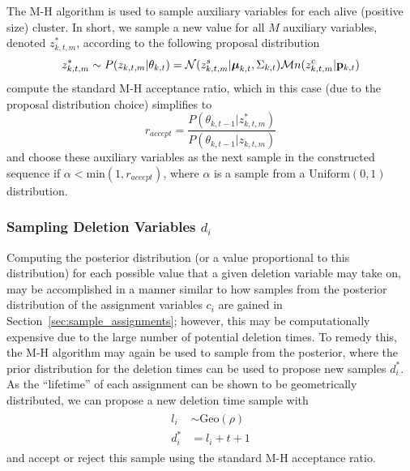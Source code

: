 \documentclass[smallcondensed, final]{svjour3}
\begin{document}
The M-H algorithm is used to sample auxiliary variables for each alive (positive size) cluster. In short, we sample a new value for all $M$ auxiliary variables, denoted $z_{k,t,m}^{*}$, according to the following proposal distribution
\begin{equation}
\label{proposal_distro}
z_{k,t,m}^{*}  \sim  P(z_{k,t,m} | \theta_{k,t}) = \mathcal{N}(z_{k,t,m}^{s} | \boldsymbol{\mu}_{k,t}, \Sigma_{k,t}) \mathcal{M}n(z_{k,t,m}^{c} | \bold{p}_{k,t})
\end{equation}
compute the standard M-H acceptance ratio, which in this case (due to the proposal distribution choice) simplifies to 
\begin{equation}
\label{accept_ratio}
r_{accept} = \frac{P(\theta_{k,t-1} | z_{k,t,m}^{*})}{P(\theta_{k,t-1} | z_{k,t,m})}
\end{equation}
and choose these auxiliary variables as the next sample in the constructed sequence if $\alpha < \text{min}(1, r_{accept})$, where $\alpha$ is a sample from a $\text{Uniform}(0,1)$ distribution.






\subsubsection{Sampling Deletion Variables $d_{i}$}
Computing the posterior distribution (or a value proportional to this distribution) for each possible value that a given deletion variable may take on, may be accomplished in a manner similar to how samples from the posterior distribution of the assignment variables $c_{i}$ are gained in Section~\ref{sec:sample_assignments}; however, this may be computationally expensive due to the large number of potential deletion times. To remedy this, the M-H algorithm may again be used to sample from the posterior, where the prior distribution for the deletion times can be used to propose new samples $d_{i}^{*}$. As the ``lifetime'' of each assignment can be shown to be geometrically distributed, we can propose a new deletion time sample with
\begin{align}
\begin{split}
l_{i}  &\sim  \text{Geo}(\rho)  \\
d_{i}^{*}  &= l_{i} + t + 1
\end{split}
\end{align}
and accept or reject this sample using the standard M-H acceptance ratio. 
\end{document}
